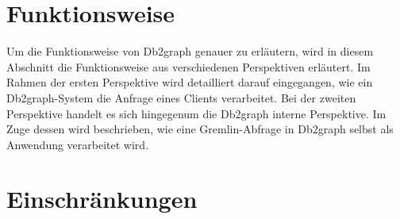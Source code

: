 \section{Funktionsweise}
\label{db2graph:funktionsweise}
Um die Funktionsweise von Db2graph genauer zu erläutern, wird in diesem Abschnitt die Funktionsweise aus verschiedenen Perspektiven erläutert. Im Rahmen der ersten Perspektive wird detailliert darauf eingegangen, wie ein Db2graph-System die Anfrage eines Clients verarbeitet. Bei der zweiten Perspektive handelt es sich hingegenum die Db2graph interne Perspektive. Im Zuge dessen wird beschrieben, wie eine Gremlin-Abfrage in Db2graph selbst als Anwendung verarbeitet wird. 

\section{Einschränkungen}
